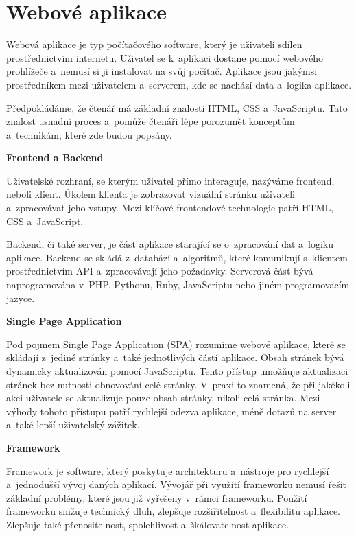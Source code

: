 \section{Webové aplikace}

Webová aplikace je typ počítačového software, který je uživateli sdílen prostřednictvím internetu. 
Uživatel se k~aplikaci dostane pomocí webového prohlížeče a~nemusí si ji instalovat na svůj počítač. 
Aplikace jsou jakýmsi prostředníkem mezi uživatelem a~serverem, kde se nachází data a~logika aplikace.\cite{codeacademywebapp}

Předpokládáme, že čtenář má základní znalosti HTML, CSS a~JavaScriptu. 
Tato znalost usnadní proces a~pomůže čtenáři lépe porozumět konceptům a~technikám, které zde budou popsány.

\begin{flushleft}
  \textbf{Frontend a Backend}
\end{flushleft}

Uživatelské rozhraní, se kterým uživatel přímo interaguje, nazýváme frontend, neboli klient.
Úkolem klienta je zobrazovat vizuální stránku uživateli a~zpracovávat jeho vstupy. 
Mezi klíčové frontendové technologie patří HTML, CSS a~JavaScript.

Backend, či také server, je část aplikace starající se o~zpracování dat a~logiku aplikace. 
Backend se skládá z~databází a~algoritmů, které komunikují s~klientem prostřednictvím API a~zpracovávají jeho požadavky. 
Serverová část bývá naprogramována v~PHP, Pythonu, Ruby, JavaScriptu nebo jiném programovacím jazyce.\cite{stateofartframeworks}

\begin{flushleft}
  \textbf{Single Page Application}
\end{flushleft}

Pod pojmem Single Page Application (SPA) rozumíme webové aplikace, které se skládají z~jediné stránky a~také jednotlivých částí aplikace. 
Obsah stránek bývá dynamicky aktualizován pomocí JavaScriptu. Tento přístup umožňuje aktualizaci stránek bez nutnosti obnovování celé stránky. 
V~praxi to znamená, že při jakékoli akci uživatele se aktualizuje pouze obsah stránky, nikoli celá stránka. 
Mezi výhody tohoto přístupu patří rychlejší odezva aplikace, méně dotazů na server a~také lepší uživatelský zážitek.\cite{jadhavspa}

\begin{flushleft}
  \textbf{Framework}
\end{flushleft}

Framework je software, který poskytuje architekturu a~nástroje pro rychlejší a~jednodušší vývoj daných aplikací. 
Vývojář při využití frameworku nemusí řešit základní problémy, které jsou již vyřešeny v~rámci frameworku. 
Použití frameworku snižuje technický dluh, zlepšuje rozšiřitelnost a~flexibilitu aplikace. 
Zlepšuje také přenositelnost, spolehlivost a~škálovatelnost aplikace.\cite{schmidtframeworks}
